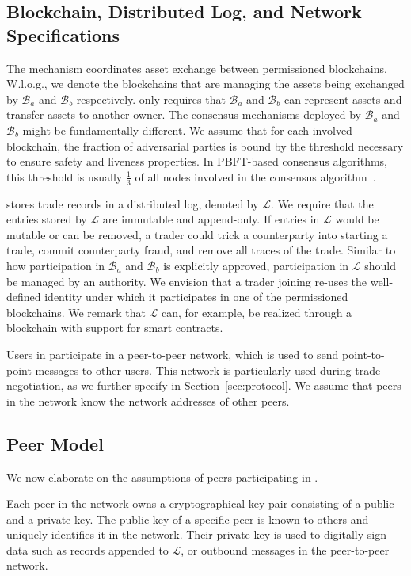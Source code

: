 \subsection{Blockchain, Distributed Log, and Network Specifications}
\label{sec:blockchain_network_specs}
The \ModelName{} mechanism coordinates asset exchange between permissioned blockchains.
W.l.o.g., we denote the blockchains that are managing the assets being exchanged by $ \mathcal{B}_a $ and $ \mathcal{B}_b $ respectively.
\ModelName{} only requires that $ \mathcal{B}_a $ and $ \mathcal{B}_b $ can represent assets and transfer assets to another owner.
The consensus mechanisms deployed by $ \mathcal{B}_a $ and $ \mathcal{B}_b $ might be fundamentally different.
We assume that for each involved blockchain, the fraction of adversarial parties is bound by the threshold necessary to ensure safety and liveness properties.
In PBFT-based consensus algorithms, this threshold is usually $ \frac{1}{3} $ of all nodes involved in the consensus algorithm~\cite{castro1999practical}.

\ModelName{} stores trade records in a distributed log, denoted by $ \mathcal{L} $.
We require that the entries stored by $ \mathcal{L} $ are immutable and append-only.
If entries in $ \mathcal{L} $ would be mutable or can be removed, a trader could trick a counterparty into starting a trade, commit counterparty fraud, and remove all traces of the trade.
Similar to how participation in $ \mathcal{B}_a $ and $ \mathcal{B}_b $ is explicitly approved, participation in $ \mathcal{L} $ should be managed by an authority.
We envision that a trader joining \ModelName{} re-uses the well-defined identity under which it participates in one of the permissioned blockchains.
We remark that $ \mathcal{L} $ can, for example, be realized through a blockchain with support for smart contracts.

Users in \ModelName{} participate in a peer-to-peer network, which is used to send point-to-point messages to other users.
This network is particularly used during trade negotiation, as we further specify in Section~\ref{sec:protocol}.
We assume that peers in the \ModelName{} network know the network addresses of other peers.

\subsection{Peer Model}
We now elaborate on the assumptions of peers participating in \ModelName{}.

Each peer in the \ModelName{} network owns a cryptographical key pair consisting of a public and a private key. 
The public key of a specific peer is known to others and uniquely identifies it in the network. 
Their private key is used to digitally sign data such as records appended to $ \mathcal{L} $, or outbound messages in the peer-to-peer network.

